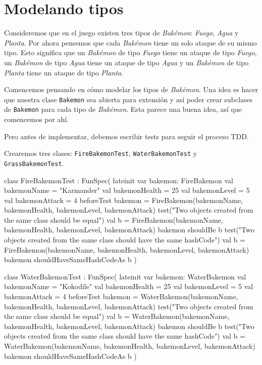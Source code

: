 \section{Modelando tipos}
  Consideremos que en el juego existen tres tipos de \textit{Bakémon}: \textit{Fuego},
  \textit{Agua} y \textit{Planta}.
  Por ahora pensemos que cada \textit{Bakémon} tiene un solo ataque de su mismo tipo.
  Esto significa que un \textit{Bakémon} de tipo \textit{Fuego} tiene un ataque de tipo
  \textit{Fuego}, un \textit{Bakémon} de tipo \textit{Agua} tiene un ataque de tipo
  \textit{Agua} y un \textit{Bakémon} de tipo \textit{Planta} tiene un ataque de tipo
  \textit{Planta}.

  Comencemos pensando en cómo modelar los tipos de \textit{Bakémon}.
  Una idea es hacer que nuestra clase \texttt{Bakemon} sea abierta para extensión y así poder
  crear subclases de \texttt{Bakemon} para cada tipo de \textit{Bakémon}.
  Esta parece una buena idea, así que comencemos por ahí.

  Pero antes de implementar, debemos escribir tests para seguir el proceso TDD.

  Crearemos tres clases: \texttt{FireBakemonTest}, \texttt{WaterBakemonTest} y
  \texttt{GrassBakemonTest}.

  \begin{kotlin}
    class FireBakemonTest : FunSpec({
      lateinit var bakemon: FireBakemon
      val bakemonName = "Karmander"
      val bakemonHealth = 25
      val bakemonLevel = 5
      val bakemonAttack = 4
      beforeTest {
        bakemon = FireBakemon(bakemonName, bakemonHealth, bakemonLevel, bakemonAttack)
      }
      test("Two objects created from the same class should be equal") {
        val b = FireBakemon(bakemonName, bakemonHealth, bakemonLevel, bakemonAttack)
        bakemon shouldBe b
      }
      test("Two objects created from the same class should have the same hashCode") {
        val b = FireBakemon(bakemonName, bakemonHealth, bakemonLevel, bakemonAttack)
        bakemon shouldHaveSameHashCodeAs b
      }
    })
  \end{kotlin}

  \begin{kotlin}
    class WaterBakemonTest : FunSpec({
      lateinit var bakemon: WaterBakemon
      val bakemonName = "Kokodile"
      val bakemonHealth = 25
      val bakemonLevel = 5
      val bakemonAttack = 4
      beforeTest {
        bakemon = WaterBakemon(bakemonName, bakemonHealth, bakemonLevel, bakemonAttack)
      }
      test("Two objects created from the same class should be equal") {
        val b = WaterBakemon(bakemonName, bakemonHealth, bakemonLevel, bakemonAttack)
        bakemon shouldBe b
      }
      test("Two objects created from the same class should have the same hashCode") {
        val b = WaterBakemon(bakemonName, bakemonHealth, bakemonLevel, bakemonAttack)
        bakemon shouldHaveSameHashCodeAs b
      }
  })
  \end{kotlin}

